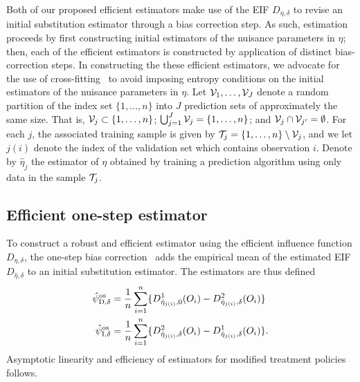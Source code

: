 Both of our proposed efficient estimators make use of the EIF $D_{\eta, \delta}$
to revise an initial substitution estimator through a bias correction step. As
such, estimation proceeds by first constructing initial estimators of the
nuisance parameters in $\eta$; then, each of the efficient estimators is
constructed by application of distinct bias-correction steps. In constructing
the these efficient estimators, we advocate for the use of
cross-fitting~\citep{klaassen1987consistent, zheng2011cross,
chernozhukov2018double} to avoid imposing entropy conditions on the initial
estimators of the nuisance parameters in $\eta$. Let ${\cal V}_1, \ldots, {\cal
V}_J$ denote a random partition of the index set $\{1, \ldots, n\}$ into $J$
prediction sets of approximately the same size. That is, ${\cal V}_j\subset
\{1, \ldots, n\}$; $\bigcup_{j=1}^J {\cal V}_j = \{1, \ldots, n\}$; and ${\cal
V}_j\cap {\cal V}_{j'} = \emptyset$. For each $j$, the associated training
sample is given by ${\cal T}_j = \{1, \ldots, n\} \setminus {\cal V}_j$, and we
let $j(i)$ denote the index of the validation set which contains observation
$i$. Denote by $\hat \eta_{j}$ the estimator of $\eta$ obtained by training a
prediction algorithm using only data in the sample ${\cal T}_j$.

\subsection{Efficient one-step estimator}

To construct a robust and efficient estimator using the efficient influence
function $D_{\eta, \delta}$, the one-step bias
correction~\citep{pfanzagl1985contributions, bickel1993efficient} adds the
empirical mean of the estimated EIF $D_{\hat{\eta}, \delta}$ to an initial
substitution estimator. The estimators are thus defined
\begin{equation}\label{eq:aipw}
  \begin{split}
    \hat\psi_{\mbox{\scriptsize D}, \delta}^{\mbox{\scriptsize os}} &= \frac{1}{n} \sum_{i = 1}^n \{D^1_{\hat\eta_{j(i)},
      0}(O_i) - D^2_{\hat\eta_{j(i)}, \delta}(O_i)\}\\
    \hat\psi_{\mbox{\scriptsize I}, \delta}^{\mbox{\scriptsize os}} &= \frac{1}{n} \sum_{i = 1}^n \{D^2_{\hat\eta_{j(i)},
      \delta}(O_i) - D^1_{\hat\eta_{j(i)}, \delta}(O_i)\}.
  \end{split}
\end{equation}
Asymptotic linearity and efficiency of estimators for modified treatment
policies follows.

